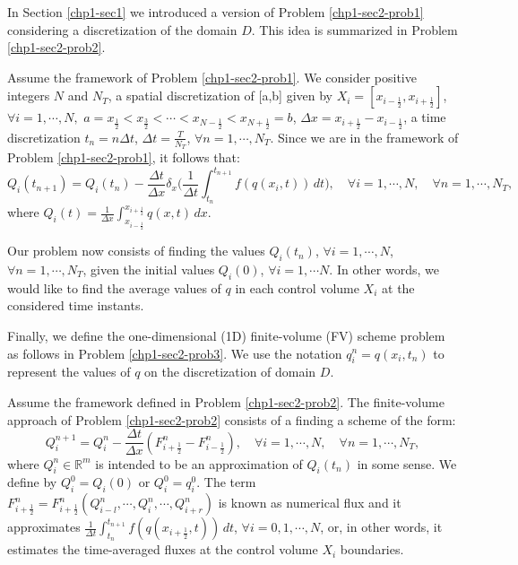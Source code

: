 In Section \ref{chp1-sec1} we introduced a version of Problem \ref{chp1-sec2-prob1}
considering a discretization of the domain $D$. 
This idea is summarized in Problem \ref{chp1-sec2-prob2}.
\begin{prob}
        \label{chp1-sec2-prob2}
	Assume the framework of Problem \ref{chp1-sec2-prob1}.
        We consider positive integers $N$ and $N_T$, a spatial discretization of [a,b] given by
        $X_i = [x_{i-\frac{1}{2}}, x_{i+\frac{1}{2}}]$,
        $\forall i = 1, \cdots, N,$ 
	$a = x_{\frac{1}{2}} < x_{\frac{3}{2}} < \cdots < x_{N-\frac{1}{2}} < x_{N+\frac{1}{2}} = b$,
	$\Delta x = x_{i+\frac{1}{2}}-x_{i-\frac{1}{2}}$,
	a time discretization
        $t_n = n\Delta t$, $\Delta t = \frac{T}{N_T}$, $\forall n = 1, \cdots, N_T$.
	Since we are in the framework of Problem \ref{chp1-sec2-prob1}, it follows that:
        \begin{equation*}
                {Q}_i(t_{n+1}) =  {Q}_i(t_n) -
                \frac{\Delta t}{\Delta x} \delta _x\bigg( \frac{1}{\Delta t}\int_{t_n}^{t_{n+1}}
                {f}({q}(x_{i}, t)) \,dt \bigg),
                \quad \forall i = 1, \cdots, N,
                \quad \forall n = 1, \cdots, N_T,
        \end{equation*}
        where ${Q}_i(t) = \frac{1}{\Delta x}
        \int_{x_{i-\frac{1}{2}}}^{x_{i+\frac{1}{2}}} {q}(x,t) \,dx$.
	
	Our problem now consists of finding the values ${Q}_i(t_{n})$, 
	$\forall i = 1, \cdots, N$, $\forall n = 1, \cdots, N_T$,
	given the initial values ${Q}_i(0)$, $\forall i = 1, \cdots N$.
	In other words, we would like to find the average values of ${q}$
	in each control volume $X_i$ at the considered time instants.
\end{prob}

Finally, we define the one-dimensional (1D) finite-volume (FV)
scheme problem as follows in Problem \ref{chp1-sec2-prob3}.
We use the notation ${q}^n_{i} = {q}(x_i, t_n)$
to represent the values of ${q}$ on the discretization of domain $D$.

\begin{prob}[1D-FV scheme]
	\label{chp1-sec2-prob3}
	Assume the framework defined in Problem \ref{chp1-sec2-prob2}.
	The finite-volume approach of Problem \ref{chp1-sec2-prob2}
	consists of a finding a scheme of the form:
        \begin{equation*}
		{Q}_{i}^{n+1} =  {Q}_{i}^{n} -
		\frac{\Delta t}{\Delta x} ({F}_{i+\frac{1}{2}}^{n} - {F}_{i-\frac{1}{2}}^{n}),
                \quad \forall i = 1, \cdots, N,
                \quad \forall n = 1, \cdots, N_T,
        \end{equation*}
	where ${Q}_{i}^{n} \in \mathbb{R}^m$ is intended to be an approximation
	of ${Q}_i(t_{n})$ in some sense. We define by ${Q}_{i}^{0} = {Q}_i(0)$ or
	${Q}_{i}^{0} = {q}^{0}_{i}$.
	The term ${F}_{i+\frac{1}{2}}^{n} = {F}_{i+\frac{1}{2}}^{n}
	(Q_{i-l}^{n}, \cdots, Q_i^n, \cdots, Q_{i+r}^{n})$
	is known as numerical flux and it approximates
	$\frac{1}{\Delta t}\int_{t_n}^{t_{n+1}} {f}({q}(x_{i+\frac{1}{2}}, t)) \,dt $,
	$\forall i = 0, 1, \cdots, N$,
	or, in other words, it estimates the time-averaged fluxes at the control volume $X_i$ boundaries.
\end{prob}

